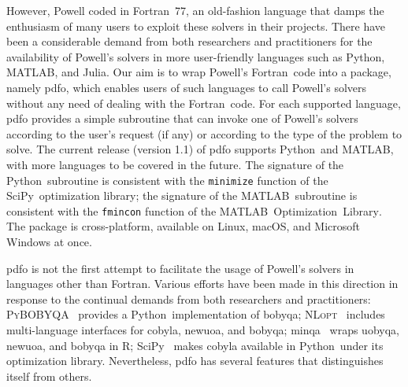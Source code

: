 \documentclass[11pt,draft]{article}
\def\fortran{\mbox{Fortran}}
\def\julia{\mbox{Julia}}
\def\matlab{\mbox{MATLAB\textsuperscript{\textregistered}}}
\def\matlabopt{\mbox{\matlab\ Optimization Library\textsuperscript{\texttrademark}}}
\def\minqa{\mbox{minqa}}
\def\nlopt{\mbox{\textsc{NLopt}}}
\def\pybobyqa{\mbox{\textsc{PyBOBYQA}}}
\def\python{\mbox{Python}}
\def\R{\mbox{R}}
\def\scipy{\mbox{SciPy}}
\begin{document}
However, Powell coded in \fortran\ 77, an old-fashion language that damps the enthusiasm of many users to exploit these solvers in their projects.
There have been a considerable demand from both researchers and practitioners for the availability of Powell's solvers in more user-friendly languages such as \python, \matlab, and \julia.
Our aim is to wrap Powell's \fortran\ code into a package, namely \gls{pdfo}, which enables users of such languages to call Powell's solvers without any need of dealing with the \fortran\ code.
For each supported language, \gls{pdfo} provides a simple subroutine that can invoke one of Powell's solvers according to the user's request (if any) or according to the type of the problem to solve. The current release (version 1.1) of \gls{pdfo} supports \python\ and \matlab, with more languages to be covered in the future.
The signature of the \python\ subroutine is consistent with the \texttt{minimize} function of the \scipy\ optimization library;
the signature of the \matlab\ subroutine is consistent with the \texttt{fmincon} function of the \matlabopt.
The package is cross-platform, available on Linux, macOS, and Microsoft Windows at once.

\Gls{pdfo} is not the first attempt to facilitate the usage of Powell's solvers in languages other than \fortran.
Various efforts have been made in this direction in response to the continual demands from both researchers and practitioners: \pybobyqa~\cite{Cartis_Etal_2019} provides a \python\ implementation of \gls{bobyqa}; \nlopt~\cite{Johnson_2019} includes multi-language interfaces for \gls{cobyla}, \gls{newuoa}, and \gls{bobyqa}; \minqa~\cite{Bates_Etal_2014} wraps \gls{uobyqa}, \gls{newuoa}, and \gls{bobyqa} in \R; \scipy~\cite{Virtanen_Etal_2020} makes \gls{cobyla} available in \python\ under its optimization library. Nevertheless, \gls{pdfo} has several features that distinguishes itself from others.
\end{document}
